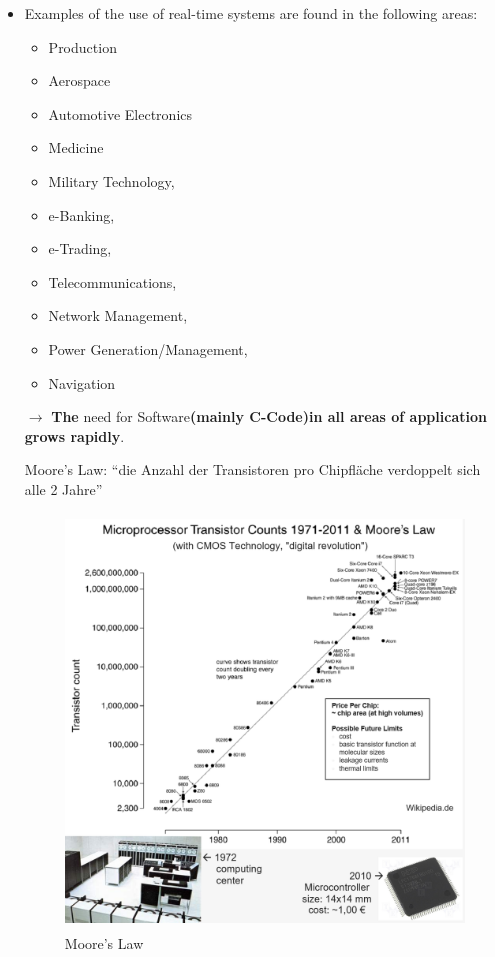 \begin{itemize}
	\item Examples of the use of real-time systems are found in the following areas: 
	\begin{multicols}{2}
	\begin{itemize}
		\item  Production 
		\item  Aerospace 
		\item  Automotive Electronics
		\item  Medicine
		\item  Military Technology, 
		\item  e-Banking, 
	\end{itemize}
	\columnbreak
	\begin{itemize}
		\item  e-Trading, 
		\item  Telecommunications, 
		\item  Network Management, 
		\item  Power Generation/Management, 
		\item  Navigation
	\end{itemize}
	\columnbreak
	\end{multicols}

$\rightarrow$ \textbf{The} need for Software\textbf{(mainly C-Code)in all areas of application grows rapidly}. 

\begin{tcolorbox}[colback=blue!5!white,colframe=blue!75!black]
  Moore's Law: “die Anzahl der Transistoren pro Chipfläche verdoppelt sich alle 2 Jahre”
\end{tcolorbox}

\begin{figure}[h]
    \centering
    \includegraphics[width=15cm, height=11cm]{Images/image9.png}
    \caption{Moore's Law}
    \label{fig:Fig 2}
\end{figure}


\end{itemize}
